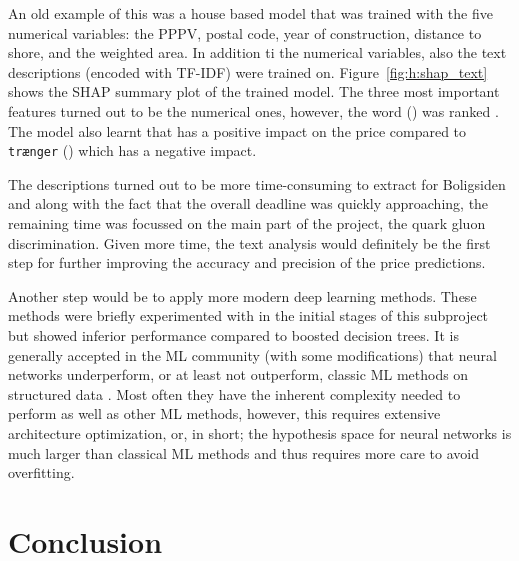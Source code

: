 An old example of this was a house based model that was trained with the five numerical variables: the PPPV, postal code, year of construction, distance to shore, and the weighted area. In addition ti the numerical variables, also the text descriptions (encoded with TF-IDF) were trained on. Figure~\ref{fig:h:shap_text} shows the SHAP summary plot of the trained model. The three most important features turned out to be the numerical ones, however, the word  () was ranked . The model also learnt that  has a positive impact on the price compared to \colorbox{light-gray}{\texttt{trænger}} () which has a negative impact.

The descriptions turned out to be more time-consuming to extract for Boligsiden and along with the fact that the overall deadline was quickly approaching, the remaining time was focussed on the main part of the project, the quark gluon discrimination. Given more time, the text analysis would definitely be the first step for further improving the accuracy and precision of the price predictions. 

Another step would be to apply more modern deep learning methods. These methods were briefly experimented with in the initial stages of this subproject but showed inferior performance compared to boosted decision trees. It is generally accepted in the ML community (with some modifications) that neural networks underperform, or at least not outperform, classic ML methods on structured data \autocite{klambauerSelfNormalizingNeuralNetworks2017}. Most often they have the inherent complexity needed to perform as well as other ML methods, however, this requires extensive architecture optimization, or, in short; the hypothesis space for neural networks is much larger than classical ML methods and thus requires more care to avoid overfitting.

\section{Conclusion}
\label{sec:h:conclusion}

